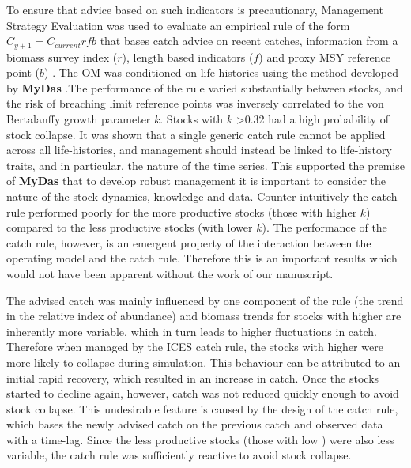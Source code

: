 To ensure that advice based on such indicators is precautionary, Management Strategy Evaluation was used to evaluate an empirical rule of the form $C_{y+1}=C_{current}rfb$ that bases catch advice on recent catches, information from a biomass survey index ($r$), length based indicators ($f$) and proxy MSY reference point ($b$) \citep{fischer2019hcr}. The OM was conditioned on life histories using the method developed by \textbf{MyDas} .The performance of the rule varied substantially between stocks, and the risk of breaching limit reference points was inversely correlated to the von Bertalanffy growth parameter $k$. Stocks with $k$ >0.32 had a high probability of stock collapse. It was shown that a single generic catch rule cannot be applied across all life-histories, and management should instead be linked to life-history traits, and in particular, the nature of the time series. This supported the premise of \textbf{MyDas} that to develop robust management it is important to consider the nature of the stock dynamics, knowledge and data. 
Counter-intuitively the catch rule performed poorly for the more productive stocks (those with higher $k$) compared to the less productive stocks (with lower $k$). The performance of the catch rule, however, is an emergent property of the interaction between the operating model and the catch rule. Therefore this is an important results which would not have been apparent without the work of our manuscript.

The advised catch was mainly influenced by one component of the rule (the trend in the relative index of abundance) and biomass trends for stocks with higher  are inherently more variable, which in turn leads to higher fluctuations in catch. Therefore when managed by the ICES catch rule, the stocks with higher  were more likely to collapse during simulation. This behaviour can be attributed to an initial rapid recovery, which resulted in an increase in catch. Once the stocks started to decline again, however, catch was not reduced quickly enough to avoid stock collapse. This undesirable feature is caused by the design of the catch rule, which bases the newly advised catch on the previous catch and observed data with a time-lag. Since the less productive stocks (those with low ) were also less variable, the catch rule was sufficiently reactive to avoid stock collapse.

